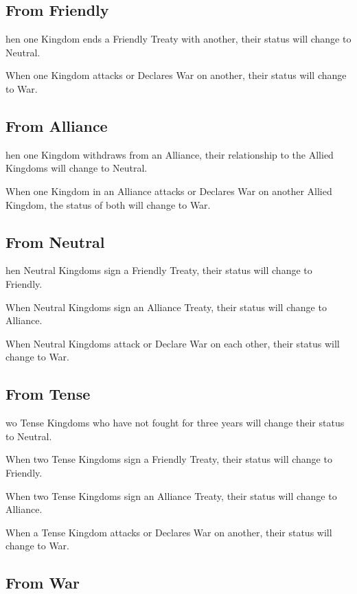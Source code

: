 
\subsection{From Friendly}

hen one Kingdom ends a Friendly Treaty with another, their status will change to Neutral.

When one Kingdom attacks or Declares War on another, their status will change to War.

\subsection{From Alliance}

hen one Kingdom withdraws from an Alliance, their relationship to the Allied Kingdoms will change to Neutral.

When one Kingdom in an Alliance attacks or Declares War on another Allied Kingdom, the status of both will change to War.

\subsection{From Neutral}

hen Neutral Kingdoms sign a Friendly Treaty, their status will change to Friendly.

When Neutral Kingdoms sign an Alliance Treaty, their status will change to Alliance.

When Neutral Kingdoms attack or Declare War on each other, their status will change to War.

\subsection{From Tense}

wo Tense Kingdoms who have not fought for three years will change their status to Neutral.

When two Tense Kingdoms sign a Friendly Treaty, their status will change to Friendly.

When two Tense Kingdoms sign an Alliance Treaty, their status will change to Alliance.

When a Tense Kingdom attacks or Declares War on another, their status will change to War.

\subsection{From War}

